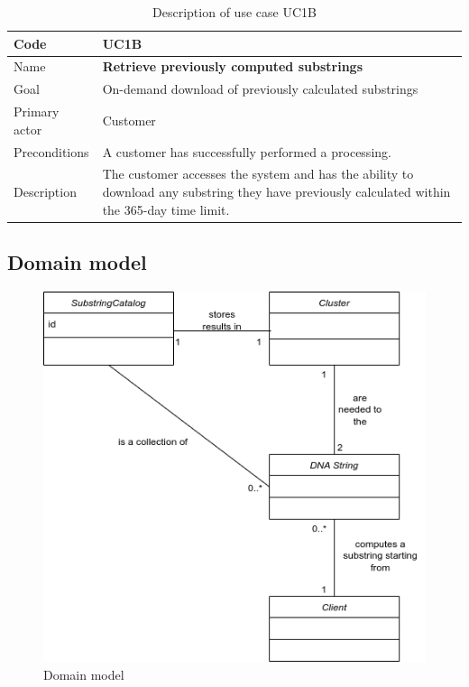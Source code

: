 \documentclass[a4paper,10pt, titlepage]{article}
\begin{document}
  \begin{table}
	\centering
\begin{tabular}{ | m{3.5cm} | m{11cm} |}
	\hline
	\rowcolor{lightgray}
	Code & \textbf{UC1B} \\
	\hline
	Name & \textbf{Retrieve previously computed substrings} \\
	\hline
	\rowcolor{lightgray}
	Goal & On-demand download of previously calculated substrings\\
	\hline
	Primary actor & Customer \\
	\rowcolor{lightgray}
	\hline
	Preconditions & A customer has successfully performed a processing.\\
	\hline
	Description & The customer accesses the system and has the ability to download any substring they have previously calculated within the 365-day time limit.\\
	\hline
  \end{tabular}
  \caption{\label{tab:uc1b-table}Description of use case UC1B}
  \end{table}
\subsection{Domain model}
\begin{figure}[H]
	\centering
	\includegraphics[width=0.5\linewidth]{figures/dommod.png}
	\caption{Domain model}
	\label{fig:dommod}
\end{figure}
\end{document}
